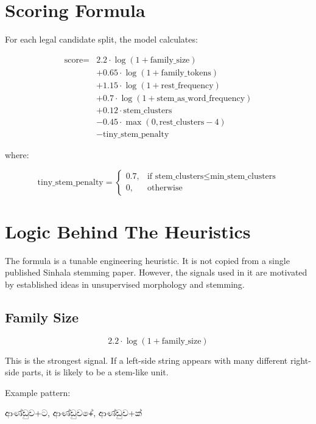 \documentclass[11pt]{article}
\newcommand{\si}[1]{{\sinhalafont #1}}
\begin{document}
\section*{Scoring Formula}

For each legal candidate split, the model calculates:

\[
\begin{aligned}
\text{score} ={}&
  2.2 \cdot \log(1 + \text{family\_size}) \\
&+ 0.65 \cdot \log(1 + \text{family\_tokens}) \\
&+ 1.15 \cdot \log(1 + \text{rest\_frequency}) \\
&+ 0.7 \cdot \log(1 + \text{stem\_as\_word\_frequency}) \\
&+ 0.12 \cdot \text{stem\_clusters} \\
&- 0.45 \cdot \max(0, \text{rest\_clusters} - 4) \\
&- \text{tiny\_stem\_penalty}
\end{aligned}
\]

where:

\[
\text{tiny\_stem\_penalty} =
\begin{cases}
0.7, & \text{if stem\_clusters} \leq \text{min\_stem\_clusters} \\
0, & \text{otherwise}
\end{cases}
\]

\section*{Logic Behind The Heuristics}

The formula is a tunable engineering heuristic. It is not copied from a single
published Sinhala stemming paper. However, the signals used in it are motivated
by established ideas in unsupervised morphology and stemming.

\subsection*{Family Size}

\[
2.2 \cdot \log(1 + \text{family\_size})
\]

This is the strongest signal. If a left-side string appears with many different
right-side parts, it is likely to be a stem-like unit.

Example pattern:

\begin{center}
\large \si{ආණ්ඩුව}+\si{ට},\quad
\si{ආණ්ඩුව}+\si{ේ},\quad
\si{ආණ්ඩුව}+\si{ක්}
\end{center}
\end{document}
